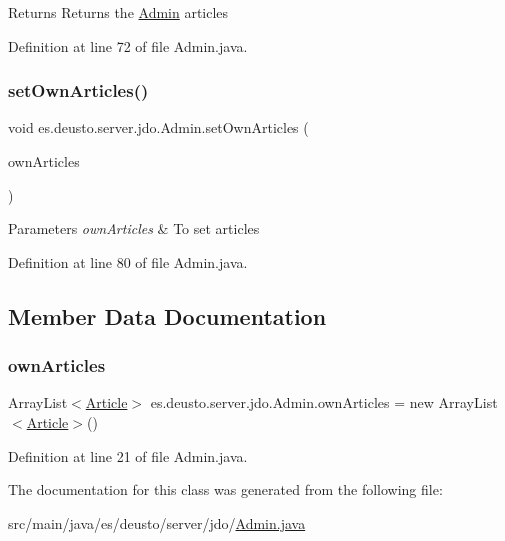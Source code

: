 \begin{DoxyReturn}{Returns}
Returns the \hyperlink{classes_1_1deusto_1_1server_1_1jdo_1_1_admin}{Admin} articles 
\end{DoxyReturn}


Definition at line 72 of file Admin.\+java.

\mbox{\label{classes_1_1deusto_1_1server_1_1jdo_1_1_admin_abb330a6e4c9e543fff03ab213055c2c4}} 
\subsubsection{\texorpdfstring{set\+Own\+Articles()}{setOwnArticles()}}
{\footnotesize\ttfamily void es.\+deusto.\+server.\+jdo.\+Admin.\+set\+Own\+Articles (\begin{DoxyParamCaption}\item[{Array\+List$<$ \hyperlink{classes_1_1deusto_1_1server_1_1jdo_1_1_article}{Article} $>$}]{own\+Articles }\end{DoxyParamCaption})}


\begin{DoxyParams}{Parameters}
{\em own\+Articles} & To set articles \\
\hline
\end{DoxyParams}


Definition at line 80 of file Admin.\+java.



\subsection{Member Data Documentation}
\mbox{\label{classes_1_1deusto_1_1server_1_1jdo_1_1_admin_aff35b2a52374104224e98ba92fd7eac3}} 
\subsubsection{\texorpdfstring{own\+Articles}{ownArticles}}
{\footnotesize\ttfamily Array\+List$<$\hyperlink{classes_1_1deusto_1_1server_1_1jdo_1_1_article}{Article}$>$ es.\+deusto.\+server.\+jdo.\+Admin.\+own\+Articles = new Array\+List$<$\hyperlink{classes_1_1deusto_1_1server_1_1jdo_1_1_article}{Article}$>$()}



Definition at line 21 of file Admin.\+java.



The documentation for this class was generated from the following file\+:\begin{DoxyCompactItemize}
\item 
src/main/java/es/deusto/server/jdo/\hyperlink{_admin_8java}{Admin.\+java}\end{DoxyCompactItemize}
